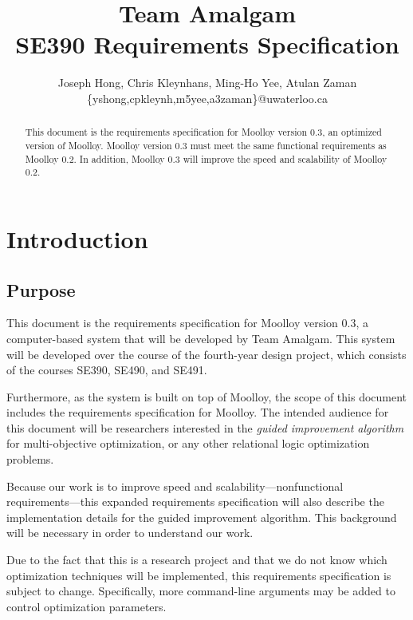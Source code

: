 \documentclass[11pt]{article}
\title{{\Large Team Amalgam} \\ SE390 Requirements Specification}
\author{Joseph Hong, Chris Kleynhans, Ming-Ho Yee, Atulan Zaman \\
        \{yshong,cpkleynh,m5yee,a3zaman\}@uwaterloo.ca}
\theoremstyle{definition}
\begin{document}
\maketitle

\begin{abstract}
This document is the requirements specification for Moolloy version
0.3, an optimized version of Moolloy. Moolloy version 0.3 must meet the
same functional requirements as Moolloy 0.2. In addition,
Moolloy 0.3 will improve the speed and scalability of Moolloy 0.2.
\end{abstract}

\tableofcontents
\newpage

\section{Introduction}\label{sec:intro}
\subsection{Purpose}\label{sec:purpose}

This document is the requirements specification for Moolloy version
0.3, a computer-based system that will be developed by Team Amalgam.
This system will be developed over the course of the fourth-year design
project, which consists of the courses SE390, SE490, and SE491.

Furthermore, as the system is built on top of Moolloy, the scope of
this document includes the requirements specification for Moolloy.
The intended audience for this document will be researchers interested
in the \textit{guided improvement algorithm} for multi-objective
optimization, or any other relational logic optimization problems.

Because our work is to improve speed and
scalability---nonfunctional requirements---this expanded requirements
specification will also describe the implementation details for the
guided improvement algorithm. This background will be necessary in
order to understand our work.

Due to the fact that this is a research project and that we do not know
which optimization techniques will be implemented, this requirements
specification is subject to change. Specifically, more command-line
arguments may be added to control optimization parameters.
\end{document}

